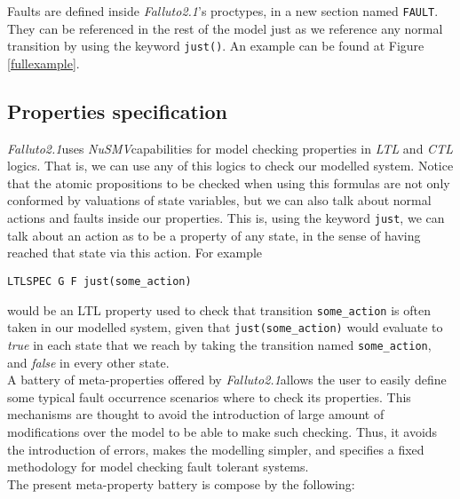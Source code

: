 \documentclass[12pt]{article}
\newcommand{\nusmv}{\mbox{\textit{NuSMV}}}
\newcommand{\falluto}{\mbox{\textit{Falluto2.1}}}
\begin{document}
Faults are defined inside \falluto's proctypes, in a new section named \texttt{FAULT}. They can be referenced in the rest of the model just as we reference any normal transition by using the keyword \texttt{just()}. An example can be found at Figure \ref{fullexample}.

\subsection{Properties specification}
\falluto uses \nusmv capabilities for model checking properties in \textit{LTL} and \textit{CTL} logics. That is, we can use any of this logics to check our modelled system. Notice that the atomic propositions to be checked when using this formulas are not only conformed by valuations of state variables, but we can also talk about normal actions and faults inside our properties. This is, using the keyword \texttt{just}, we can talk about an action as to be a property of any state, in the sense of having reached that state via this action. For example
\begin{center}
\texttt{LTLSPEC G F just(some\_action)}
\end{center}
would be an LTL property used to check that transition \texttt{some\_action} is often taken in our modelled system, given that \texttt{just(some\_action)} would evaluate to \textit{true} in each state that we reach by taking the transition named \texttt{some\_action}, and \textit{false} in every other state.\\
A battery of meta-properties offered by \falluto allows the user to easily define some typical fault occurrence scenarios where to check its properties. This mechanisms are thought to avoid the introduction of large amount of modifications over the model to be able to make such checking. Thus, it avoids the introduction of errors, makes the modelling simpler, and specifies a fixed methodology for model checking fault tolerant systems.\\
The present meta-property battery is compose by the following:
\end{document}
